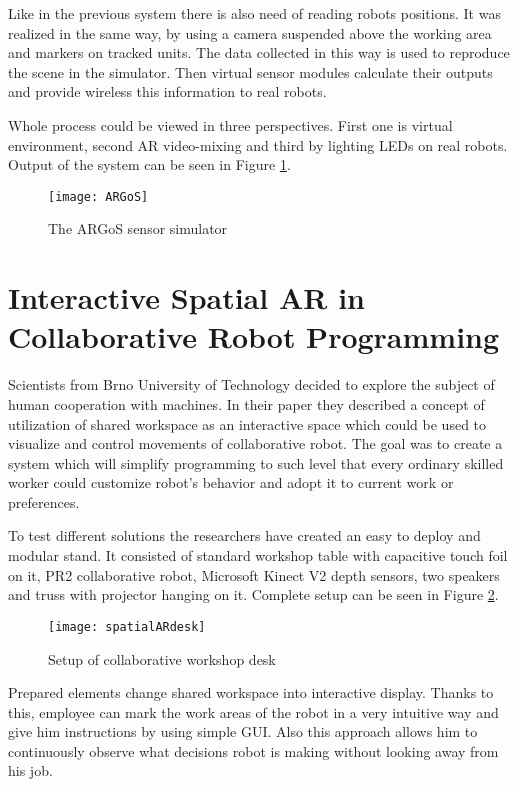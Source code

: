 \documentclass[printmode,en]{mgr}
\begin{document}
Like in the previous system there is also need of reading robots positions. It was realized in the same way, by using a camera suspended above the working area and markers on tracked units. The data collected in this way is used to reproduce the scene in the simulator. Then virtual sensor modules calculate their outputs and provide wireless this information to real robots.

Whole process could be viewed in three perspectives. First one is virtual environment, second AR video-mixing and third by lighting LEDs on real robots. Output of the system can be seen in Figure \ref{fig:ARGoS}.

\begin{figure}[!ht]
  \centering
    \texttt{[image: ARGoS]}
  \caption{The ARGoS sensor simulator \cite{ARGoS}}
  \label{fig:ARGoS}
\end{figure}

\section{Interactive Spatial AR in Collaborative Robot Programming}
Scientists from Brno University of Technology decided to explore the subject of human cooperation with machines. In their paper \cite{SpatialARCollaborative} they described a concept of utilization of shared workspace as an interactive space which could be used to visualize and control movements of collaborative robot. The goal was to create a system which will simplify programming to such level that every ordinary skilled worker could customize robot's behavior and adopt it to current work or preferences.

To test different solutions the researchers have created an easy to deploy and modular stand. It consisted of standard workshop table with capacitive touch foil on it, PR2 collaborative robot, Microsoft Kinect V2 depth sensors, two speakers and truss with projector hanging on it. Complete setup can be seen in Figure \ref{fig:spatialARdesk}.

\begin{figure}[!ht]
  \centering
    \texttt{[image: spatialARdesk]}
  \caption{Setup of collaborative workshop desk \cite{SpatialARCollaborative}}
  \label{fig:spatialARdesk}
\end{figure}

Prepared elements change shared workspace into interactive display. Thanks to this, employee can mark the work areas of the robot in a very intuitive way and give him instructions by using simple GUI. Also this approach allows him to continuously observe what decisions robot is making without looking away from his job.
\end{document}
